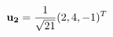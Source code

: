 \documentclass[preview]{standalone}
\begin{document}
\begin{align*}
\mathbf{u_2} = { 1 \over \sqrt{21} } (2, 4, -1)^T
\end{align*}
\end{document}
